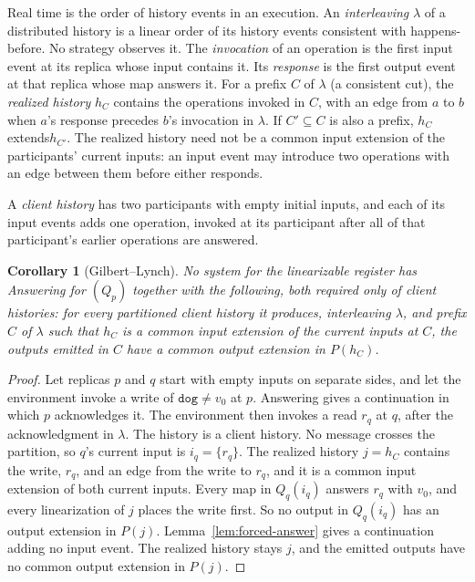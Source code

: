 \documentclass[sigconf]{cidr-2027}
\newtheorem{corollary}{Corollary}
\theoremstyle{remark}
\newcommand{\inrel}{extends\xspace}          %
\newcommand{\indesc}{input extension\xspace} %
\newcommand{\outnoun}{output extension\xspace}%
\newcommand{\fiber}[1]{P(#1)}
\newcommand{\dog}{\texttt{dog}}
\begin{document}
Real time is the order of history events in an execution. An
\emph{interleaving} $\lambda$ of a distributed history is a linear order of
its history events consistent with happens-before. No strategy observes it. The \emph{invocation} of an operation is the first input event at its replica
whose input contains it. Its \emph{response} is the first output event at
that replica whose map answers it. For a prefix $C$ of $\lambda$ (a
consistent cut), the \emph{realized history} $h_C$ contains the operations
invoked in $C$, with an edge from $a$ to $b$ when $a$'s response precedes
$b$'s invocation in $\lambda$. If $C'\subseteq C$ is also a prefix, $h_C$
\inrel $h_{C'}$. The realized history need not be a common \indesc of the
participants' current inputs: an input event may introduce two operations with
an edge between them before either responds.

A \emph{client history} has two participants with empty initial inputs, and
each of its input events adds one operation, invoked at its participant after
all of that participant's earlier operations are answered.

\begin{corollary}[Gilbert--Lynch]
\label{cor:gilbert-lynch}
No system for the linearizable register has Answering for $(Q_p)$ together
with the following, both required only of client histories: for every
partitioned client history it produces, interleaving $\lambda$, and prefix $C$
of $\lambda$ such that $h_C$ is a common \indesc of the current inputs at $C$,
the outputs emitted in $C$ have a common \outnoun in $\fiber{h_C}$.
\end{corollary}

\begin{proof}
Let replicas $p$ and $q$ start with empty inputs on separate sides, and let
the environment invoke a write of $\dog\neq v_0$ at $p$. Answering gives a
continuation in which $p$ acknowledges it. The environment then invokes a read
$r_q$ at $q$, after the acknowledgment in $\lambda$. The history is a client
history. No message crosses the partition, so $q$'s current input is
$i_q=\{r_q\}$. The realized history $j=h_C$ contains the write, $r_q$, and an
edge from the write to $r_q$, and it is a common \indesc of both current
inputs. Every map in $Q_q(i_q)$ answers $r_q$ with $v_0$, and every
linearization of $j$ places the write first. So no output in $Q_q(i_q)$ has
an \outnoun in $\fiber{j}$. Lemma~\ref{lem:forced-answer} gives a
continuation adding no input event. The realized history stays $j$, and the
emitted outputs have no common \outnoun in $\fiber{j}$.
\end{proof}
\end{document}
